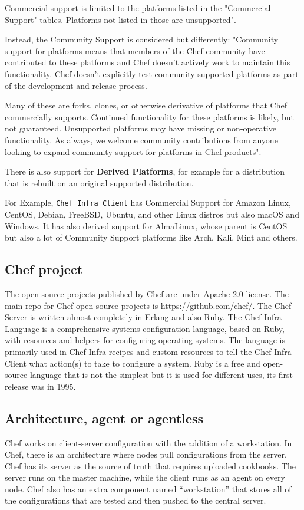 \documentclass[12pt,a4paper,openright,twoside]{book}
\begin{document}
Commercial support is limited to the platforms listed in the "Commercial Support" tables.
Platforms not listed in those are unsupported"\cite{chefDocPlatforms}.

Instead, the Community Support is considered but differently:
"Community support for platforms means that members of the Chef community have contributed to these platforms and Chef doesn't actively work to maintain this functionality. Chef doesn't explicitly test community-supported platforms as part of the development and release process.

Many of these are forks, clones, or otherwise derivative of platforms that Chef commercially supports.
Continued functionality for these platforms is likely, but not guaranteed.
Unsupported platforms may have missing or non-operative functionality.
As always, we welcome community contributions from anyone
looking to expand community support for platforms in Chef products"\cite{chefDocPlatforms}.


There is also support for \textbf{Derived Platforms}, for example for a distribution that is rebuilt on an original supported distribution.

For Example, \texttt{Chef Infra Client} has Commercial Support for Amazon Linux, CentOS, Debian, FreeBSD, Ubuntu, and other Linux distros but also macOS and Windows.
It has also derived support for AlmaLinux, whose parent is CentOS but also a lot of Community Support platforms like Arch, Kali, Mint and others.

\subsection{Chef project}
The open source projects published by Chef are under Apache 2.0 license.
The main repo for Chef open source projects is \url{https://github.com/chef/}.
The Chef Server is written almost completely in Erlang and also Ruby.
The Chef Infra Language is a comprehensive systems configuration language, based on Ruby, with resources and helpers for configuring operating systems. The language is primarily used in Chef Infra recipes and custom resources to tell the Chef Infra Client what action(s) to take to configure a system\cite{chefInfraLanguage}.
Ruby is a free and open-source language that is not the simplest but it is used for different uses, its first release was in 1995.

\subsection{Architecture, agent or agentless}
Chef works on client-server configuration with the addition of a workstation.
In Chef, there is an architecture where nodes pull configurations from the server. Chef has its server as the source of truth that requires uploaded cookbooks.
The server runs on the master machine, while the client runs as an agent on every node. Chef also has an extra component named “workstation” that stores all of the configurations that are tested and then pushed to the central server.
\end{document}
